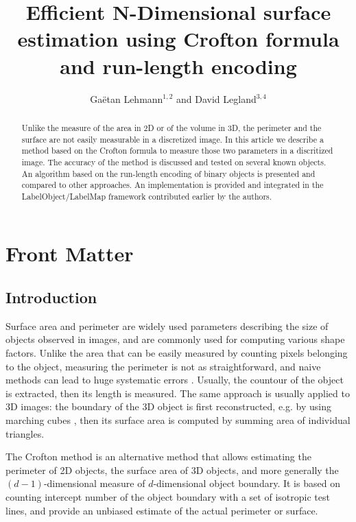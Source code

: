 \documentclass{InsightArticle}
\title{Efficient N-Dimensional surface estimation using Crofton formula and run-length encoding}
\author{Ga\"etan Lehmann$^{1,2}$ {\small{and}} David Legland$^{3,4}$}
\newcommand{\IJhandlerIDnumber}{3342}
\begin{document}
%
%
\IJhandlefooter{\IJhandlerIDnumber}

\maketitle

\ifhtml
\chapter*{Front Matter\label{front}}
\fi


\begin{abstract}
\noindent
Unlike the measure of the area in 2D or of the volume in 3D, the perimeter and the surface are not easily measurable in a discretized image.
In this article we describe a method based on the Crofton formula to measure those two parameters in a discritized image. The accuracy of
the method is discussed and tested on several known objects. An algorithm based on the run-length encoding of binary objects is presented
and compared to other approaches.
An implementation is provided and integrated in the LabelObject/LabelMap framework contributed earlier by the authors.
\end{abstract}

\IJhandlenote{\IJhandlerIDnumber}

\tableofcontents

\section{Introduction}

Surface area and perimeter are widely used parameters describing the size of objects observed in images, 
and are commonly used for computing various shape factors.
Unlike the area that can be easily measured by counting pixels belonging to the object, measuring the 
perimeter is not as straightforward, 
and naive methods can lead to huge systematic errors \cite{Klette2004, Legland2007}.
Usually, the countour of the object is extracted, then its length is measured.
The same approach is usually applied to 3D images: the boundary of the 3D object is first reconstructed,
e.g. by using marching cubes \cite{Lorensen1987}, then its surface area is computed by summing 
area of individual triangles.

The Crofton method is an alternative method that allows estimating the perimeter of 2D objects,
the surface area of 3D objects, and more generally the $(d-1)$-dimensional measure of $d$-dimensional 
object boundary. 
It is based on counting intercept number of the object boundary with a set of isotropic test lines, 
and provide an unbiased estimate of the actual perimeter or surface.
\end{document}
